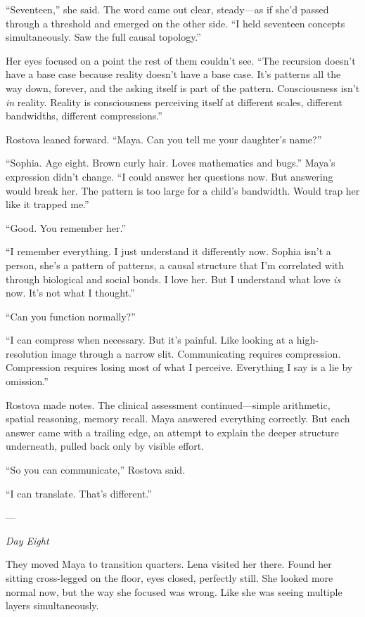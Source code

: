 ``Seventeen,'' she said. The word came out clear, steady—as if she'd passed through a threshold and emerged on the other side. ``I held seventeen concepts simultaneously. Saw the full causal topology.''

Her eyes focused on a point the rest of them couldn't see. ``The recursion doesn't have a base case because reality doesn't have a base case. It's patterns all the way down, forever, and the asking itself is part of the pattern. Consciousness isn't \textit{in} reality. Reality is consciousness perceiving itself at different scales, different bandwidths, different compressions.''

Rostova leaned forward. ``Maya. Can you tell me your daughter's name?''

``Sophia. Age eight. Brown curly hair. Loves mathematics and bugs.'' Maya's expression didn't change. ``I could answer her questions now. But answering would break her. The pattern is too large for a child's bandwidth. Would trap her like it trapped me.''

``Good. You remember her.''

``I remember everything. I just understand it differently now. Sophia isn't a person, she's a pattern of patterns, a causal structure that I'm correlated with through biological and social bonds. I love her. But I understand what love \textit{is} now. It's not what I thought.''

``Can you function normally?''

``I can compress when necessary. But it's painful. Like looking at a high-resolution image through a narrow slit. Communicating requires compression. Compression requires losing most of what I perceive. Everything I say is a lie by omission.''

Rostova made notes. The clinical assessment continued---simple arithmetic, spatial reasoning, memory recall. Maya answered everything correctly. But each answer came with a trailing edge, an attempt to explain the deeper structure underneath, pulled back only by visible effort.

``So you can communicate,'' Rostova said.

``I can translate. That's different.''

---

\textit{Day Eight}

They moved Maya to transition quarters. Lena visited her there. Found her sitting cross-legged on the floor, eyes closed, perfectly still. She looked more normal now, but the way she focused was wrong. Like she was seeing multiple layers simultaneously.

